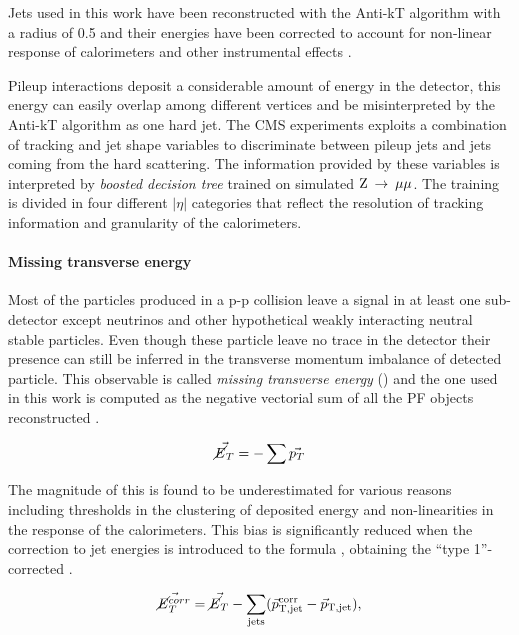 Jets used in this work have been reconstructed with the Anti-kT algorithm with a radius of 0.5 and their energies have been corrected to account for non-linear response of calorimeters and other instrumental effects \cite{Chatrchyan:2011ds}.

Pileup interactions deposit a considerable amount of energy in the detector, this energy can easily overlap among different vertices and be misinterpreted by the Anti-kT algorithm as one hard jet. The CMS experiments exploits a combination of tracking and jet shape variables to discriminate between pileup jets and jets coming from the hard scattering. The information provided by these variables is interpreted by \emph{boosted decision tree} \cite{CMS-PAS-JME-13-005} trained on simulated $\mathrm{Z}\:\rightarrow\:\mu\mu$. The training is divided in four different $|\eta|$ categories that reflect the resolution of tracking information and granularity of the calorimeters.

\paragraph{Missing transverse energy}

Most of the particles produced in a p-p collision leave a signal in at least one sub-detector except neutrinos and other hypothetical weakly interacting neutral stable particles. Even though these particle leave no trace in the detector their presence can still be inferred in the transverse momentum imbalance of detected particle. This observable is called \emph{missing transverse energy} (\MET) and the one used in this work is computed as the negative vectorial sum of all the PF objects reconstructed \cite{CMS-PAS-JME-13-003}. 

\begin{equation}
\vec{\cancel{E}_T} = -\sum \vec{p_{T}}
\end{equation}

The magnitude of this \MET is found to be underestimated for various reasons including thresholds in the clustering of deposited energy and non-linearities in the response of the calorimeters. This bias is significantly reduced when the correction to jet energies is introduced to the formula \cite{Chatrchyan:2011ds}, obtaining the ``type 1''-corrected \MET.

\begin{equation}
\vec{\cancel{E}_T^{corr}} = \vec{\cancel{E}_T } - \sum_\mathrm{jets} (\vec{p}_\mathrm{T,jet}^\mathrm{corr}-\vec{p}_\mathrm{T,jet}),
\label{eq:Type1MET}
\end{equation}

